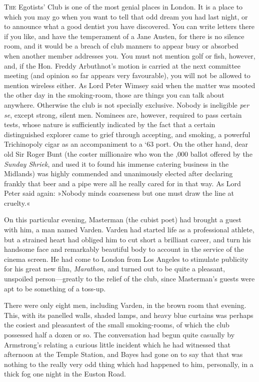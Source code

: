 
\lettrine[lines=4]{T}{he} Egotists' Club is one of the most genial places in London. It is a place to which you may go when you want to tell that odd dream you had last night, or to announce what a good dentist you have discovered. You can write letters there if you like, and have the temperament of a Jane Austen, for there is no silence room, and it would be a breach of club manners to appear busy or absorbed when another member addresses you. You must not mention golf or fish, however, and, if the Hon. Freddy Arbuthnot's motion is carried at the next committee meeting (and opinion so far appears very favourable), you will not be allowed to mention wireless either. As Lord Peter Wimsey said when the matter was mooted the other day in the smoking-room, those are things you can talk about anywhere. Otherwise the club is not specially exclusive. Nobody is ineligible \textit{per se}, except strong, silent men. Nominees are, however, required to pass certain tests, whose nature is sufficiently indicated by the fact that a certain distinguished explorer came to grief through accepting, and smoking, a powerful Trichinopoly cigar as an accompaniment to a `63 port. On the other hand, dear old Sir Roger Bunt (the coster millionaire who won the ,000 ballot offered by the \textit{Sunday Shriek}, and used it to found his immense catering business in the Midlands) was highly commended and unanimously elected after declaring frankly that beer and a pipe were all he really cared for in that way. As Lord Peter said again: »Nobody minds coarseness but one must draw the line at cruelty.«

On this particular evening, Masterman (the cubist poet) had brought a guest with him, a man named Varden. Varden had started life as a professional athlete, but a strained heart had obliged him to cut short a brilliant career, and turn his handsome face and remarkably beautiful body to account in the service of the cinema screen. He had come to London from Los Angeles to stimulate publicity for his great new film, \textit{Marathon}, and turned out to be quite a pleasant, unspoiled person—greatly to the relief of the club, since Masterman's guests were apt to be something of a toss-up.

There were only eight men, including Varden, in the brown room that evening. This, with its panelled walls, shaded lamps, and heavy blue curtains was perhaps the cosiest and pleasantest of the small smoking-rooms, of which the club possessed half a dozen or so. The conversation had begun quite casually by Armstrong's relating a curious little incident which he had witnessed that afternoon at the Temple Station, and Bayes had gone on to say that that was nothing to the really very odd thing which had happened to him, personally, in a thick fog one night in the Euston Road.

